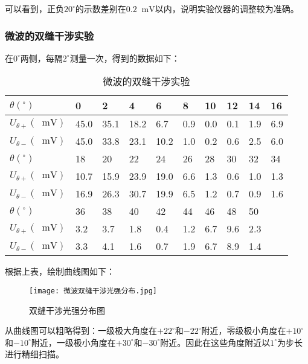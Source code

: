 \documentclass[11pt]{article}
\newcommand*{\unit}[1]{\mathop{}\!\mathrm{#1}}
\begin{document}
可以看到，正负$20^\circ$的示数差别在$0.2\unit{mV}$以内，说明实验仪器的调整较为准确。

\subsubsection{微波的双缝干涉实验}

在$0^\circ$两侧，每隔$2^\circ$测量一次，得到的数据如下：

\begin{table}[H]
  \centering
	\begin{tabular}{|l|l|l|l|l|l|l|l|l|l|}
		\hline
		$\theta(^\circ)$ & 0    & 2    & 4    & 6    & 8    & 10  & 12  & 14  & 16  \\ \hline
		$U_{\theta+}(\unit{mV})$ &45.0  & 35.1  & 18.2  & 6.7   & 0.9   & 0.0   & 0.1   & 1.9   & 6.9 \\ \hline
		$U_{\theta-}(\unit{mV})$ &45.0  & 33.8  & 23.1  & 10.2  & 1.0   & 0.2   & 0.6   & 2.5   & 6.0 \\ \hline
		$\theta(^\circ)$ & 18 & 20   & 22   & 24   & 26   & 28  & 30  & 32  & 34  \\ \hline
		$U_{\theta+}(\unit{mV})$ &10.7  & 15.9  & 23.9  & 19.0  & 6.6   & 1.3   & 0.6   & 1.0   & 1.3   \\ \hline
		$U_{\theta-}(\unit{mV})$ &16.9  & 26.3  & 30.7  & 19.9  & 6.5   & 1.2   & 0.7   & 0.9   & 1.6   \\ \hline
		$\theta(^\circ)$ & 36   & 38   & 40   & 42   & 44   & 46  & 48  & 50  &     \\ \hline
		$U_{\theta+}(\unit{mV})$   &3.2   & 3.7   & 1.8   & 0.4   & 1.2   & 6.7   & 9.6   & 2.3   &       \\ \hline
		$U_{\theta-}(\unit{mV})$   & 3.3   & 4.1   & 1.6   & 0.7   & 1.9   & 6.7   & 8.9   & 1.4   &  \\ \hline
	\end{tabular}
  \caption{微波的双缝干涉实验}
\end{table}

根据上表，绘制曲线图如下：

\begin{figure}[H]
  \centering
  \texttt{[image: 微波双缝干涉光强分布.jpg]}
  \caption{双缝干涉光强分布图}
\end{figure}

从曲线图可以粗略得到：一级极大角度在$+22^\circ$和$-22^\circ$附近，零级极小角度在$+10^\circ$和$-10^\circ$附近，一级极小角度在$+30^\circ$和$-30^\circ$附近。因此在这些角度附近以$1^\circ$为步长进行精细扫描。
\end{document}
